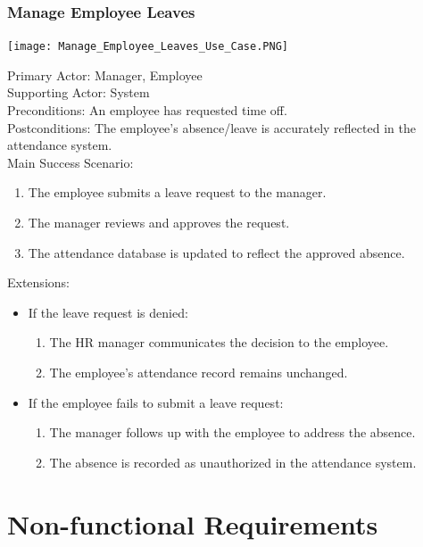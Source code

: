\documentclass[a4paper, 12pt]{article}
\begin{document}
\subsubsection{Manage Employee Leaves}
\begin{center}
\texttt{[image: Manage\_Employee\_Leaves\_Use\_Case.PNG]}\par
\end{center}
Primary Actor: Manager, Employee\\
Supporting Actor: System\\
Preconditions: An employee has requested time off.\\
Postconditions: The employee's absence/leave is accurately reflected in the attendance system.\\
\newpage
Main Success Scenario:
\begin{enumerate}
    \item The employee submits a leave request to the manager.
    \item The manager reviews and approves the request.
    \item The attendance database is updated to reflect the approved absence.
\end{enumerate}
Extensions:
\begin{itemize}
    \item If the leave request is denied:
    \begin{enumerate}
        \item The HR manager communicates the decision to the employee.
        \item The employee's attendance record remains unchanged.
    \end{enumerate}
    \item If the employee fails to submit a leave request:
    \begin{enumerate}
        \item The manager follows up with the employee to address the absence.
        \item The absence is recorded as unauthorized in the attendance system.
    \end{enumerate}
\end{itemize}

\newpage
\section{Non-functional Requirements}
\end{document}
